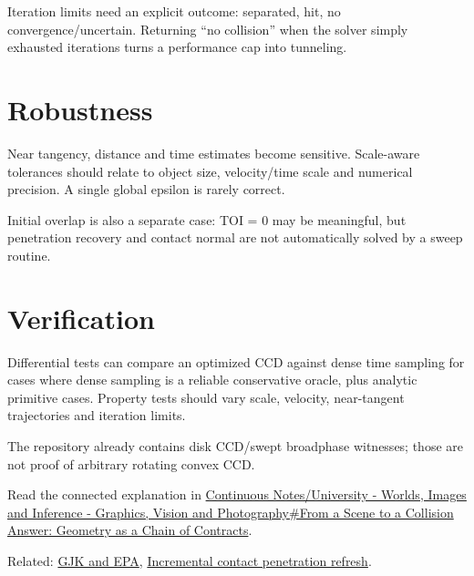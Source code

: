 Iteration limits need an explicit outcome: separated, hit, no convergence/uncertain. Returning ``no collision'' when the solver simply exhausted iterations turns a performance cap into tunneling.

\section{Robustness}\label{appendix-66956ed6c753-robustness}

Near tangency, distance and time estimates become sensitive. Scale-aware tolerances should relate to object size, velocity/time scale and numerical precision. A single global epsilon is rarely correct.

Initial overlap is also a separate case: TOI = 0 may be meaningful, but penetration recovery and contact normal are not automatically solved by a sweep routine.

\section{Verification}\label{appendix-66956ed6c753-verification}

Differential tests can compare an optimized CCD against dense time sampling for cases where dense sampling is a reliable conservative oracle, plus analytic primitive cases. Property tests should vary scale, velocity, near-tangent trajectories and iteration limits.

The repository already contains disk CCD/swept broadphase witnesses; those are not proof of arbitrary rotating convex CCD.

Read the connected explanation in \href{Continuous\%20Notes/University\%20-\%20Worlds,\%20Images\%20and\%20Inference\%20-\%20Graphics,\%20Vision\%20and\%20Photography\#From\%20a\%20Scene\%20to\%20a\%20Collision\%20Answer:\%20Geometry\%20as\%20a\%20Chain\%20of\%20Contracts}{Continuous Notes/University - Worlds, Images and Inference - Graphics, Vision and Photography\#From a Scene to a Collision Answer: Geometry as a Chain of Contracts}.

Related: \hyperref[appendix-aef6177f7b3f]{GJK and EPA}, \hyperref[appendix-f682275acbdf]{Incremental contact penetration refresh}.

